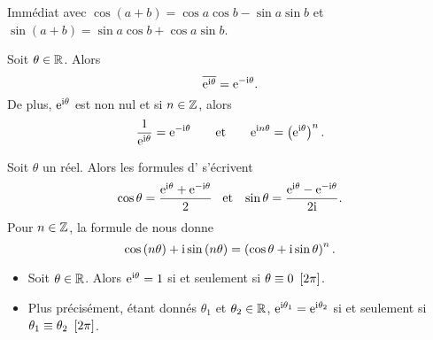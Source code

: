 \documentclass{magnoliaold}
\begin{document}
\begin{preuve}
Immédiat avec $\cos(a+b)=\cos a\cos b-\sin a\sin b$ et $\sin(a+b)=\sin a\cos b+\cos a\sin b$.
\end{preuve}

\begin{proposition}[utile=-3]
Soit $\theta\in\mathbb{R}$. Alors
\[\overline{{\rm e}^{{\rm i}\theta}}={\rm e}^{-{\rm i}\theta}.\]
De plus, ${\rm e}^{{\rm i}\theta}$ est non nul et si $n\in\mathbb{Z}$, alors
\[\frac{1}{{\rm e}^{{\rm i}\theta}}={\rm e}^{-{\rm i}\theta} \qquad\text{et}\qquad {\rm e}^{{\rm i} n\theta}=
  \left({\rm e}^{{\rm i} \theta}\right)^n.\]  
\end{proposition}


\begin{proposition}[utile=-3, nom={Formules d'\nom{Euler} et \nom{Moivre}}]
Soit $\theta$ un réel. Alors les formules d' s'écrivent
\[\cos\theta=\frac{{\rm e}^{{\rm i} \theta}+{\rm e}^{-{\rm i}\theta}}{2} \quad\!\text{et}\quad\!
  \sin\theta=\frac{{\rm e}^{{\rm i} \theta}-{\rm e}^{-{\rm i}\theta}}{2{\rm i}}.\]
Pour $n\in\mathbb{Z}$, la formule de  nous donne
\[\cos \left(n\theta\right)+{\rm i}\sin\left(n\theta\right)=\left(\cos \theta+{\rm i}\sin \theta\right)^n.\]
\end{proposition}


\begin{proposition}[utile=-3]
\begin{itemize}
\item Soit $\theta\in\mathbb{R}$. Alors ${\rm e}^{{\rm i}\theta}=1$ si et seulement si
  $\theta\equiv 0\ \left[2\pi\right]$.
\item Plus précisément, étant donnés $\theta_1$ et $\theta_2\in\mathbb{R}$,
  ${\rm e}^{{\rm i}\theta_1}={\rm e}^{{\rm i}\theta_2}$ si et seulement si
  $\theta_1\equiv\theta_2\ \cro{2\pi}$.
\end{itemize}
\end{proposition}
\end{document}
